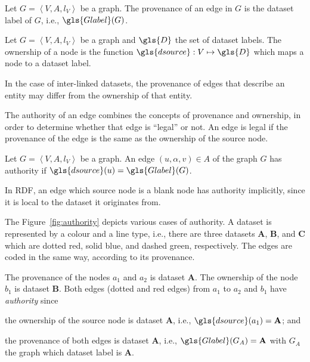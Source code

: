 \begin{definition}
	Let $G = \left\langle V, A, l_V \right\rangle$ be a graph. The provenance of an edge in $G$ is the dataset label of $G$, i.e., $\gls{Glabel}(G)$.
\end{definition}

\begin{definition}
	Let $G = \left\langle V, A, l_V \right\rangle$ be a graph and $\gls{D}$ the set of dataset labels. The ownership of a node is the function $\gls{dsource} : V \mapsto \gls{D}$ which maps a node to a dataset label.
\end{definition}

\begin{remark}
	In the case of inter-linked datasets, the provenance of edges that describe an entity may differ from the ownership of that entity.
\end{remark}

The authority of an edge combines the concepts of provenance and ownership, in order to determine whether that edge is ``legal'' or not. An edge is legal if the provenance of the edge is the same as the ownership of the source node.

\begin{definition}
	Let $G = \left\langle V, A, l_V \right\rangle$ be a graph.
	An edge $(u, \alpha, v) \in A$ of the graph $G$ has authority if $\gls{dsource}(u) = \gls{Glabel}(G)$.
\end{definition}

\begin{remark}
	In RDF, an edge which source node is a blank node has authority implicitly, since it is local to the dataset it originates from.
\end{remark}

The Figure~\ref{fig:authority} depicts various cases of authority. A dataset is represented by a colour and a line type, i.e., there are three datasets {\bfseries A}, {\bfseries B}, and {\bfseries C} which are dotted red, solid blue, and dashed green, respectively. The edges are coded in the same way, according to its provenance.

The provenance of the nodes $a_1$ and $a_2$ is dataset {\bfseries A}. The ownership of the node $b_1$ is dataset {\bfseries B}. Both edges (dotted and red edges) from $a_1$ to $a_2$ and $b_1$ have \emph{authority} since
\begin{inparaenum}[(1)]
	\item the ownership of the source node is dataset {\bfseries A}, i.e., $\gls{dsource}(a_1) = \textbf{A}$; and
	\item the provenance of both edges is dataset {\bfseries A}, i.e., $\gls{Glabel}(G_A) = \textbf{A}$ with $G_A$ the graph which dataset label is \textbf{A}.
\end{inparaenum}

